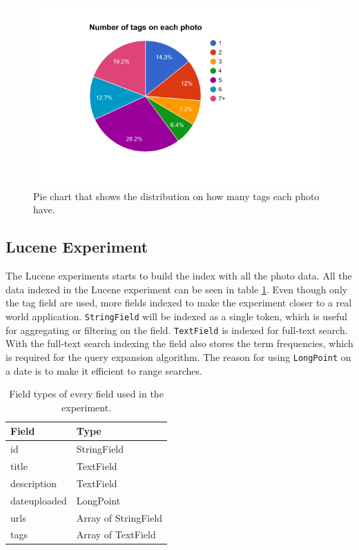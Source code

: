 \begin{figure}[h!]
  \centering \includegraphics[width=1\linewidth]{img/number-of-tags-distribution.png}
  \caption{Pie chart that shows the distribution on how many tags each photo have.}
  \label{fig:pie-chart-tag-distribution}
\end{figure}

\subsection{Lucene Experiment}
The Lucene experiments starts to build the index with all the photo data.
All the data indexed in the Lucene experiment can be seen in table \ref{tbl:lucene-field-types}.
Even though only the tag field are used,
more fields indexed to make the experiment closer to a real world application.
\texttt{StringField} will be indexed as a single token,
which is useful for aggregating or filtering on the field.
\texttt{TextField} is indexed for full-text search.
With the full-text search indexing the field also stores the term frequencies,
which is required for the query expansion algorithm.
The reason for using \texttt{LongPoint} on a date is to make it efficient to range searches.

\begin{table}[h!]
    \begin{tabular}{|l|l|}
    \hline
    \textbf{Field}& \textbf{Type}                 \\ \hline
    id           & StringField          \\ \hline
    title        & TextField            \\ \hline
    description  & TextField            \\ \hline
    dateuploaded & LongPoint            \\ \hline
    urls         & Array of StringField \\ \hline
    tags         & Array of TextField   \\ \hline
    \end{tabular}
    \centering
    \caption{Field types of every field used in the experiment.}
    \label{tbl:lucene-field-types}
\end{table}

